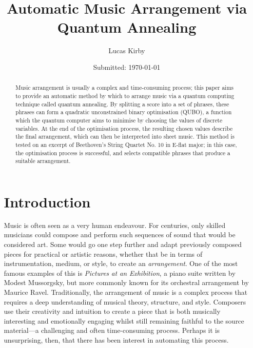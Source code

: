 \documentclass[aps,pra,12pt,onecolumn]{revtex4-2}
\begin{document}
\title{Automatic Music Arrangement via Quantum Annealing}
\author{Lucas Kirby} %
\date{Submitted: \today{}}

\begin{abstract}              

Music arrangement is usually a complex and time-consuming process; this paper aims to provide an automatic method by which to arrange music via a quantum computing technique called quantum annealing. By splitting a score into a set of phrases, these phrases can form a quadratic unconstrained binary optimisation (QUBO), a function which the quantum computer aims to minimise by choosing the values of discrete variables. At the end of the optimisation process, the resulting chosen values describe the final arrangement, which can then be interpreted into sheet music. This method is tested on an excerpt of Beethoven's String Quartet No. 10 in E-flat major; in this case, the optimisation process is successful, and selects compatible phrases that produce a suitable arrangement.

\end{abstract}

\maketitle

\thispagestyle{plain} %

\section{Introduction} 

Music is often seen as a very human endeavour. For centuries, only skilled musicians could compose and perform such sequences of sound that would be considered art. Some would go one step further and adapt previously composed pieces for practical or artistic reasons, whether that be in terms of instrumentation, medium, or style, to create an \textit{arrangement}. One of the most famous examples of this is \textit{Pictures at an Exhibition}, a piano suite written by Modest Mussorgsky, but more commonly known for its orchestral arrangement by Maurice Ravel.
Traditionally, the arrangement of music is a complex process that requires a deep understanding of musical theory, structure, and style. Composers use their creativity and intuition to create a piece that is both musically interesting and emotionally engaging whilst still remaining faithful to the source material—a challenging and often time-consuming process. Perhaps it is unsurprising, then, that there has been interest in automating this process.
\end{document}
